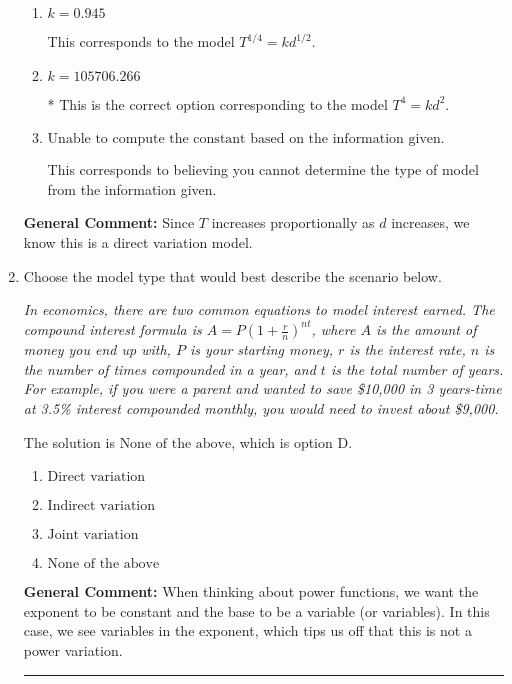 \documentclass{extbook}[14pt]
\newcommand{\litem}[1]{\item #1

\rule{\textwidth}{0.4pt}}
\begin{document}
\begin{enumerate}
{\begin{enumerate}[label=\Alph*.]
This copies the constant used in the homework.
\item \( k = 0.945 \)

This corresponds to the model $T^{1/4} = k d^{1/2}$.
\item \( k = 105706.266 \)

* This is the correct option corresponding to the model $T^{4} = k d^{2}$.
\item \( \text{Unable to compute the constant based on the information given.} \)

This corresponds to believing you cannot determine the type of model from the information given.
\end{enumerate}

\textbf{General Comment:} Since $T$ increases proportionally as $d$ increases, we know this is a direct variation model.
}
\litem{
Choose the model type that would best describe the scenario below.

\begin{center}
    \textit{ In economics, there are two common equations to model interest earned. The compound interest formula is $A = P (1 + \frac{r}{n})^{nt}$, where $A$ is the amount of money you end up with, $P$ is your starting money, $r$ is the interest rate, $n$ is the number of times compounded in a year, and $t$ is the total number of years. For example, if you were a parent and wanted to save \$10,000 in 3 years-time at 3.5\% interest compounded monthly, you would need to invest about \$9,000. }
\end{center}
The solution is \( \text{None of the above} \), which is option D.\begin{enumerate}[label=\Alph*.]
\item \( \text{Direct variation} \)


\item \( \text{Indirect variation} \)


\item \( \text{Joint variation} \)


\item \( \text{None of the above} \)


\end{enumerate}

\textbf{General Comment:} When thinking about power functions, we want the exponent to be constant and the base to be a variable (or variables). In this case, we see variables in the exponent, which tips us off that this is not a power variation.
}
\end{enumerate}
\end{document}
